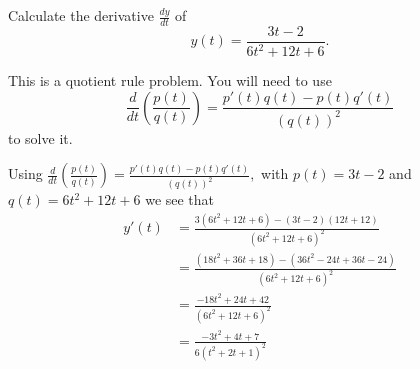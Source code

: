 \documentclass{ximera}
\author{Emma Smith Zbarsky}
\begin{document}
\begin{exercise}

Calculate the derivative $\frac{dy}{dt}$ of
\[y(t) = \frac{3t-2}{6t^2+12t+6}.\]


\begin{hint}
This is a quotient rule problem. You will need to use
\[\frac{d}{dt}\left(\frac{p(t)}{q(t)}\right) = \frac{p'(t)q(t)-p(t)q'(t)}{\left(q(t)\right)^2}\]
to solve it.
\end{hint}


\begin{hint}
Using
$\frac{d}{dt}\left(\frac{p(t)}{q(t)}\right) = \frac{p'(t)q(t)-p(t)q'(t)}{\left(q(t)\right)^2},$
with $p(t) = 3t-2$ and $q(t) = 6t^2+12t+6$ we see that \begin{align*}
y'(t) &= \frac{3(6t^2+12t+6)-(3t-2)(12t+12)}{(6t^2+12t+6)^2} \\
&= \frac{(18t^2+36t+18)-(36t^2-24t+36t-24)}{(6t^2+12t+6)^2} \\
&= \frac{-18t^2+24t+42}{(6t^2+12t+6)^2} \\
&= \boxed{\frac{-3t^2+4t+7}{6(t^2+2t+1)^2}}
\end{align*}
\end{hint}


\begin{multipleChoice}
\end{multipleChoice}

\end{exercise}
\end{document}
